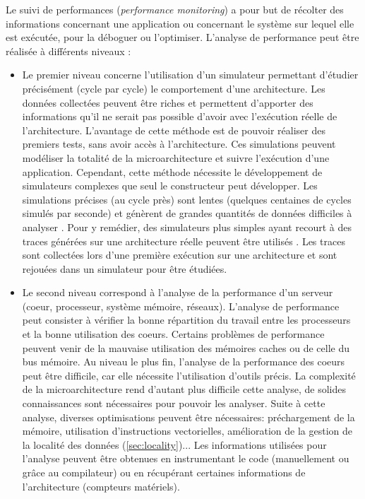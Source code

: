        Le suivi de performances (\textit{performance monitoring}) a pour but de récolter des informations concernant une application ou concernant le système sur lequel elle est exécutée, pour la déboguer ou l'optimiser. L'analyse de performance peut être réalisée à différents niveaux \cite{imbert2011tips} : 
        \begin{itemize}
            \item Le premier niveau concerne l'utilisation d'un simulateur permettant d'étudier précisément (cycle par cycle) le comportement d'une architecture. Les données collectées peuvent être riches et permettent d'apporter des informations qu'il ne serait pas possible d'avoir avec l'exécution réelle de l'architecture. L'avantage de cette méthode est de pouvoir réaliser des premiers tests, sans avoir accès à l'architecture. Ces simulations peuvent modéliser la totalité de la microarchitecture et suivre l'exécution d'une application. Cependant, cette méthode nécessite le développement de simulateurs complexes que seul le constructeur peut développer. Les simulations précises (au cycle près) sont lentes (quelques centaines de cycles simulés par seconde) et génèrent de grandes quantités de données difficiles à analyser \cite{palomares2015combining}. Pour y remédier, des simulateurs plus simples ayant recourt à des traces générées sur une architecture réelle peuvent être utilisés \cite{Cmelik1995}. Les traces sont collectées lors d'une première exécution sur une architecture et sont rejouées dans un simulateur pour être étudiées.
            
            \item Le second niveau correspond à l'analyse de la performance d'un serveur (coeur, processeur, système mémoire, réseaux). L'analyse de performance peut consister à vérifier la bonne répartition du travail entre les processeurs et la bonne utilisation des coeurs. Certains problèmes de performance peuvent venir de la mauvaise utilisation des mémoires caches ou de celle du bus mémoire. Au niveau le plus fin, l'analyse de la performance des coeurs peut être difficile, car elle nécessite l'utilisation d'outils précis. La complexité de la microarchitecture rend d'autant plus difficile cette analyse, de solides connaissances sont nécessaires pour pouvoir les analyser. Suite à cette analyse, diverses optimisations peuvent être nécessaires: préchargement de la mémoire, utilisation d'instructions vectorielles, amélioration de la gestion de la localité des données (\autoref{sec:locality})... Les informations utilisées pour l'analyse peuvent être obtenues en instrumentant le code (manuellement ou grâce au compilateur) ou en récupérant certaines informations de l'architecture (compteurs matériels).
            

\end{itemize}
